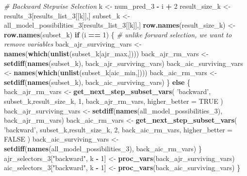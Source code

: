 \documentclass[
]{article}
\newenvironment{Shaded}{\begin{snugshade}}{\end{snugshade}}
\newcommand{\CommentTok}[1]{\textcolor[rgb]{0.56,0.35,0.01}{\textit{#1}}}
\newcommand{\ControlFlowTok}[1]{\textcolor[rgb]{0.13,0.29,0.53}{\textbf{#1}}}
\newcommand{\DataTypeTok}[1]{\textcolor[rgb]{0.13,0.29,0.53}{#1}}
\newcommand{\DecValTok}[1]{\textcolor[rgb]{0.00,0.00,0.81}{#1}}
\newcommand{\KeywordTok}[1]{\textcolor[rgb]{0.13,0.29,0.53}{\textbf{#1}}}
\newcommand{\NormalTok}[1]{#1}
\newcommand{\OperatorTok}[1]{\textcolor[rgb]{0.81,0.36,0.00}{\textbf{#1}}}
\newcommand{\OtherTok}[1]{\textcolor[rgb]{0.56,0.35,0.01}{#1}}
\newcommand{\StringTok}[1]{\textcolor[rgb]{0.31,0.60,0.02}{#1}}
\begin{document}
\begin{Shaded}
\begin{Highlighting}[]
  \CommentTok{# Backward Stepwise Selection}
\NormalTok{  k <-}\StringTok{ }\NormalTok{num_pred_}\DecValTok{3} \OperatorTok{-}\StringTok{ }\NormalTok{i }\OperatorTok{+}\StringTok{ }\DecValTok{2}
\NormalTok{  result_size_k <-}\StringTok{ }\NormalTok{results_}\DecValTok{3}\NormalTok{[results_list_}\DecValTok{3}\NormalTok{[[k]],]}
\NormalTok{  subset_k <-}\StringTok{ }\NormalTok{all_model_possibilities_}\DecValTok{3}\NormalTok{[results_list_}\DecValTok{3}\NormalTok{[[k]],]}
  \KeywordTok{row.names}\NormalTok{(result_size_k) <-}\StringTok{ }\KeywordTok{row.names}\NormalTok{(subset_k)}
  \ControlFlowTok{if}\NormalTok{ (i }\OperatorTok{==}\StringTok{ }\DecValTok{1}\NormalTok{) \{}
    \CommentTok{# unlike forward selection, we want to remove variables}
\NormalTok{    back_ajr_surviving_vars <-}\StringTok{ }\KeywordTok{names}\NormalTok{(}\KeywordTok{which}\NormalTok{(}\KeywordTok{unlist}\NormalTok{(subset_k[ajr_max,])))}
\NormalTok{    back_ajr_rm_vars <-}\StringTok{ }\KeywordTok{setdiff}\NormalTok{(}\KeywordTok{names}\NormalTok{(subset_k), back_ajr_surviving_vars)}
\NormalTok{    back_aic_surviving_vars <-}\StringTok{ }\KeywordTok{names}\NormalTok{(}\KeywordTok{which}\NormalTok{(}\KeywordTok{unlist}\NormalTok{(subset_k[aic_min,])))}
\NormalTok{    back_aic_rm_vars <-}\StringTok{ }\KeywordTok{setdiff}\NormalTok{(}\KeywordTok{names}\NormalTok{(subset_k), back_aic_surviving_vars)}
\NormalTok{  \} }\ControlFlowTok{else}\NormalTok{ \{}
\NormalTok{    back_ajr_rm_vars <-}\StringTok{ }\KeywordTok{get_next_step_subset_vars}\NormalTok{(}
      \StringTok{'backward'}\NormalTok{, subset_k,result_size_k, }\DecValTok{1}\NormalTok{,}
\NormalTok{      back_ajr_rm_vars, }\DataTypeTok{higher_better =} \OtherTok{TRUE}
\NormalTok{      )}
\NormalTok{    back_ajr_surviving_vars <-}\StringTok{ }\KeywordTok{setdiff}\NormalTok{(}\KeywordTok{names}\NormalTok{(all_model_possibilities_}\DecValTok{3}\NormalTok{),}
\NormalTok{                                       back_ajr_rm_vars)}
\NormalTok{    back_aic_rm_vars <-}\StringTok{ }\KeywordTok{get_next_step_subset_vars}\NormalTok{(}
      \StringTok{'backward'}\NormalTok{, subset_k,result_size_k, }\DecValTok{2}\NormalTok{,}
\NormalTok{      back_aic_rm_vars, }\DataTypeTok{higher_better =} \OtherTok{FALSE}
\NormalTok{      )}
\NormalTok{    back_aic_surviving_vars <-}\StringTok{ }\KeywordTok{setdiff}\NormalTok{(}\KeywordTok{names}\NormalTok{(all_model_possibilities_}\DecValTok{3}\NormalTok{),}
\NormalTok{                                       back_aic_rm_vars)}
\NormalTok{  \}}
\NormalTok{  ajr_selectors_}\DecValTok{3}\NormalTok{[}\StringTok{"backward"}\NormalTok{, k }\OperatorTok{-}\StringTok{ }\DecValTok{1}\NormalTok{] <-}\StringTok{ }\KeywordTok{proc_vars}\NormalTok{(back_ajr_surviving_vars)}
\NormalTok{  aic_selectors_}\DecValTok{3}\NormalTok{[}\StringTok{"backward"}\NormalTok{, k }\OperatorTok{-}\StringTok{ }\DecValTok{1}\NormalTok{] <-}\StringTok{ }\KeywordTok{proc_vars}\NormalTok{(back_aic_surviving_vars)}
\NormalTok{\}}
\end{Highlighting}
\end{Shaded}
\end{document}

